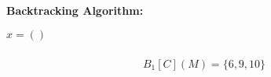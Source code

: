 \begin{minipage}[t]{8cm}
    \centering
    {\Large\bf Backtracking Algorithm:}

    \begin{minipage}{4cm}
        \centering
        \vspace{1.9mm}
        $x=()$
        \begin{graybox}
            \setlength{\abovedisplayskip}{0pt}
            \setlength{\belowdisplayskip}{0pt}
            \vspace{-0.5em}
            \begin{gather*}
                \\B_1[C](M)=\{6,9,10\}\\
            \end{gather*}
        \end{graybox}
        \vspace{-0.75em}
        {\Huge {}}
        \hspace{0.8cm}
        {\Huge{}}
        \hspace{0.8cm}
        {\Huge{}}
    \end{minipage}


\end{minipage}
